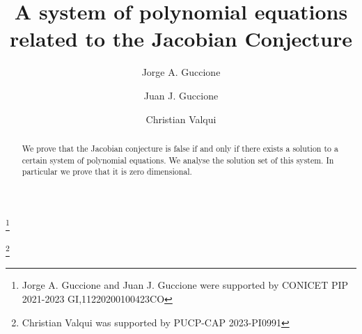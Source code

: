 \documentclass[reqno,a4paper]{amsart}
\theoremstyle{definition}
\theoremstyle{remark}
\begin{document}
\title{A system of polynomial equations related to the Jacobian Conjecture}


\author{Jorge A. Guccione}
\address{Departamento de Matem\'atica\\ Facultad de Ciencias Exactas y Naturales-UBA,
Pabell\'on~1-Ciudad Universitaria\\ Intendente Guiraldes 2160 (C1428EGA) Buenos Aires, Argentina.}
\address{Instituto de Investigaciones Matem\'aticas ``Luis A. Santal\'o"\\ Facultad de
Ciencias Exactas y Natu\-ra\-les-UBA, Pabell\'on~1-Ciudad Universitaria\\ Intendente
Guiraldes 2160 (C1428EGA) Buenos Aires, Argentina.}

\author{Juan J. Guccione}
\address{Departamento de Matem\'atica\\ Facultad de Ciencias Exactas y Naturales-UBA\\
Pabell\'on~1-Ciudad Universitaria\\ Intendente Guiraldes 2160 (C1428EGA) Buenos Aires, Argentina.}
\address{Instituto Argentino de Matem\'atica-CONICET\\ Savedra 15 3er piso\\ (C1083ACA)
Buenos Aires, Argentina.}
\thanks{Jorge A. Guccione and Juan J. Guccione were supported by CONICET PIP 2021-2023 GI,11220200100423CO}

\author[C. Valqui]{Christian Valqui}
\address{Pontificia Universidad Cat\'olica del Per\'u, Secci\'on Matem\'aticas, PUCP,
Av. Universitaria 1801, San Miguel, Lima 32, Per\'u.}
\address{Instituto de Matem\'atica y Ciencias Afines (IMCA) Calle Los Bi\'ologos 245.
Urb San C\'esar. La Molina, Lima 12, Per\'u.}
\thanks{Christian Valqui was supported by PUCP-CAP 2023-PI0991}


\begin{abstract} We prove that the Jacobian conjecture is false if and only if there exists
a solution to a certain system of polynomial equations. We analyse the solution set of this
system. In particular we prove that it is zero dimensional.
\end{abstract}


\maketitle
\end{document}
